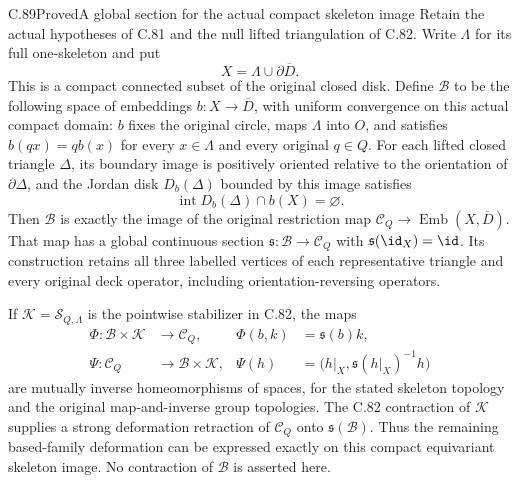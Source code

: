 \begin{claim}{C.89}{Proved}{A global section for the actual compact skeleton image}
Retain the actual hypotheses of C.81 and
the null lifted triangulation of C.82.
Write $\Lambda$ for its full one-skeleton
and put
\[
                    X=\Lambda\cup\partial\overline D .
                                                                  \tag{C.89.1}
\]
This is a compact connected subset of the
original closed disk. Define $\mathscr B$
to be the following space of embeddings
$b:X\to\overline D$, with uniform convergence
on this actual compact domain:
$b$ fixes the original circle, maps
$\Lambda$ into $O$, and satisfies
$b(qx)=q b(x)$ for every $x\in\Lambda$
and every original $q\in Q$.
For each lifted closed triangle $\Delta$,
its boundary image is positively oriented
relative to the orientation of $\partial\Delta$,
and the Jordan disk $D_b(\Delta)$ bounded
by this image satisfies
\[
                 \operatorname{int}D_b(\Delta)\cap b(X)
                               =\varnothing .                  \tag{C.89.2}
\]
Then $\mathscr B$ is exactly the image
of the original restriction map
$\mathscr C_Q\to\operatorname{Emb}(X,\overline D)$.
That map has a global continuous section
$\mathfrak s:\mathscr B\to\mathscr C_Q$
with $\mathfrak s(\id_X)=\id$.
Its construction retains all three labelled
vertices of each representative triangle
and every original deck operator, including
orientation-reversing operators.

If $\mathscr K=\mathscr S_{Q,\Lambda}$
is the pointwise stabilizer in C.82,
the maps
\[
 \begin{aligned}
 \Phi:\mathscr B\times\mathscr K&\longrightarrow\mathscr C_Q,
       &\Phi(b,k)&=\mathfrak s(b)k,\\
 \Psi:\mathscr C_Q&\longrightarrow\mathscr B\times\mathscr K,
       &\Psi(h)&=\bigl(h|_X,\mathfrak s(h|_X)^{-1}h\bigr)
 \end{aligned}                                                   \tag{C.89.3}
\]
are mutually inverse homeomorphisms of
spaces, for the stated skeleton topology
and the original map-and-inverse group
topologies. The C.82 contraction of
$\mathscr K$ supplies a strong deformation
retraction of $\mathscr C_Q$ onto
$\mathfrak s(\mathscr B)$.
Thus the remaining based-family deformation
can be expressed exactly on this compact
equivariant skeleton image. No contraction
of $\mathscr B$ is asserted here.
\end{claim}

